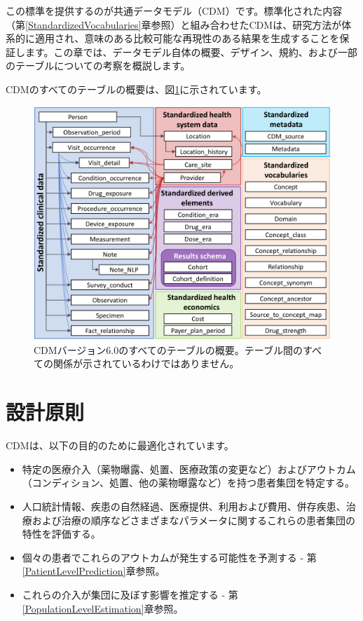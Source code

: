 \documentclass[
  11pt]{book}
\providecommand{\tightlist}{%
  \setlength{\itemsep}{0pt}\setlength{\parskip}{0pt}}
\theoremstyle{definition}
\theoremstyle{definition}
\theoremstyle{definition}
\theoremstyle{definition}
\theoremstyle{remark}
\begin{document}
この標準を提供するのが共通データモデル（CDM）です。標準化された内容（第\ref{StandardizedVocabularies}章参照）と組み合わせたCDMは、研究方法が体系的に適用され、意味のある比較可能な再現性のある結果を生成することを保証します。この章では、データモデル自体の概要、デザイン、規約、および一部のテーブルについての考察を概説します。

CDMのすべてのテーブルの概要は、図\ref{fig:cdmDiagram}に示されています。 

\begin{figure}
\includegraphics[width=1\linewidth]{images/CommonDataModel/cdmDiagram} \caption{CDMバージョン6.0のすべてのテーブルの概要。テーブル間のすべての関係が示されているわけではありません。}\label{fig:cdmDiagram}
\end{figure}

\section{設計原則}\label{ux8a2dux8a08ux539fux5247}

CDMは、以下の目的のために最適化されています。 

\begin{itemize}
\tightlist
\item
  特定の医療介入（薬物曝露、処置、医療政策の変更など）およびアウトカム（コンディション、処置、他の薬物曝露など）を持つ患者集団を特定する。
\item
  人口統計情報、疾患の自然経過、医療提供、利用および費用、併存疾患、治療および治療の順序などさまざまなパラメータに関するこれらの患者集団の特性を評価する。
\item
  個々の患者でこれらのアウトカムが発生する可能性を予測する - 第\ref{PatientLevelPrediction}章参照。
\item
  これらの介入が集団に及ぼす影響を推定する - 第\ref{PopulationLevelEstimation}章参照。
\end{itemize}
\end{document}
